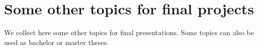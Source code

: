 \section*{Some other topics for final projects}

\pagestyle{plain}
\fancyhf{}
\fancyfoot[CE,CO]{\leftmark}
\fancyfoot[LE,RO]{\thepage}

We collect here some other topics for final presentations. Some topics
can also be used as bachelor or master theses.



%




